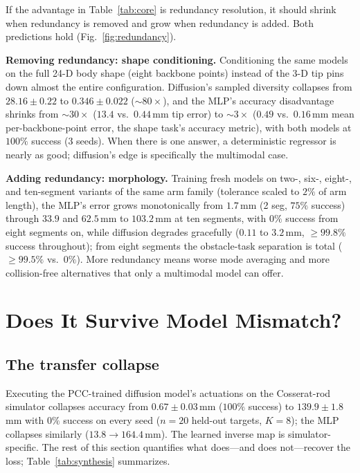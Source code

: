 If the advantage in Table~\ref{tab:core} is redundancy resolution, it should
shrink when redundancy is removed and grow when redundancy is added. Both
predictions hold (Fig.~\ref{fig:redundancy}).

\textbf{Removing redundancy: shape conditioning.} Conditioning the same
models on the full 24-D body shape (eight backbone points) instead of the
3-D tip pins down almost the entire configuration. Diffusion's sampled
diversity collapses from $28.16\pm0.22$ to $0.346\pm0.022$
(${\sim}80\times$), and the MLP's accuracy disadvantage shrinks from
${\sim}30\times$ ($13.4$ vs.\ $0.44\,$mm tip error) to ${\sim}3\times$
($0.49$ vs.\ $0.16\,$mm mean per-backbone-point error, the shape task's
accuracy metric), with both models at $100\%$ success (3 seeds). When there is
one answer, a deterministic regressor is nearly as good; diffusion's edge
is specifically the multimodal case.

\textbf{Adding redundancy: morphology.} Training fresh models on two-,
six-, eight-, and ten-segment variants of the same arm family (tolerance
scaled to $2\%$ of arm length), the MLP's error grows monotonically from
$1.7\,$mm (2 seg, $75\%$ success) through $33.9$ and $62.5\,$mm to
$103.2\,$mm at ten segments, with $0\%$ success from eight segments on,
while diffusion degrades gracefully ($0.11$ to $3.2\,$mm, ${\geq}99.8\%$
success throughout); from eight segments the obstacle-task separation is
total (${\geq}99.5\%$ vs.\ $0\%$). More redundancy means worse mode
averaging and more collision-free alternatives that only a multimodal model
can offer.

\section{Does It Survive Model Mismatch?}
\label{sec:transfer}

\subsection{The transfer collapse}
Executing the PCC-trained diffusion model's actuations on the Cosserat-rod
simulator collapses accuracy from $0.67\pm0.03\,$mm ($100\%$ success) to
$139.9\pm1.8\,$mm with $0\%$ success on every seed ($n{=}20$ held-out
targets, $K{=}8$); the MLP collapses similarly ($13.8 \rightarrow
164.4\,$mm). The learned inverse map is simulator-specific. The rest of this
section quantifies what does---and does not---recover the loss;
Table~\ref{tab:synthesis} summarizes.

